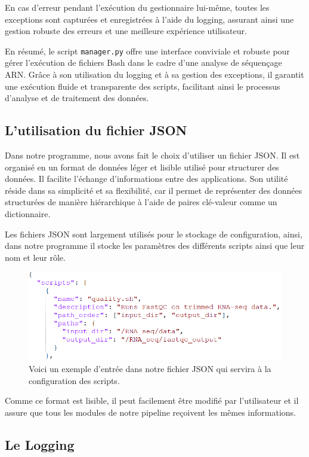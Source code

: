 En cas d'erreur pendant l'exécution du gestionnaire lui-même, toutes les exceptions sont capturées et enregistrées à l'aide du logging, assurant ainsi une gestion robuste des erreurs et une meilleure expérience utilisateur.\newline

En résumé, le script \texttt{manager.py} offre une interface conviviale et robuste pour gérer l'exécution de fichiers Bash dans le cadre d'une analyse de séquençage ARN. Grâce à son utilisation du logging et à sa gestion des exceptions, il garantit une exécution fluide et transparente des scripts, facilitant ainsi le processus d'analyse et de traitement des données.


\subsection{L'utilisation du fichier JSON}
Dans notre programme, nous avons fait le choix d’utiliser un fichier JSON. Il est organisé en un format de données léger et lisible utilisé pour structurer des données. Il facilite l’échange d’informations entre des applications. Son utilité réside dans sa simplicité et sa flexibilité, car il permet de représenter des données structurées de manière hiérarchique à l'aide de paires clé-valeur comme un dictionnaire.

Les fichiers JSON sont largement utilisés pour le stockage de configuration, ainsi, dans notre programme il stocke les paramètres des différents scripts ainsi que leur nom et leur rôle.

\begin{figure}
    \centering
    \includegraphics[width=.5\textwidth]{img/exemple_json.PNG}
    \caption{Voici un exemple d’entrée dans notre fichier JSON qui servira à la configuration des scripts.}
    \label{fig:JSON}
\end{figure}


Comme ce format est lisible, il peut facilement être modifié par l’utilisateur et il assure que tous les modules de notre pipeline reçoivent les mêmes informations.


\subsection{Le Logging}

